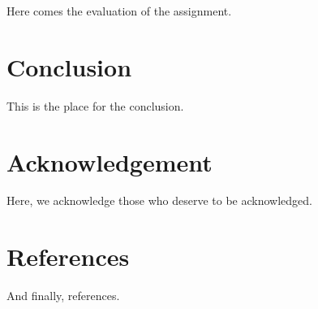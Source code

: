 \documentclass{article}
\begin{document}
Here comes the evaluation of the assignment.

\part{Conclusion}

This is the place for the conclusion.

\part{Acknowledgement}

Here, we acknowledge those who deserve to be acknowledged.

\part{References}

And finally, references.
\end{document}
